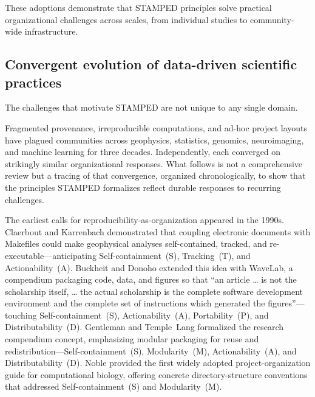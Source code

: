 \documentclass{article}
\makeatletter
\newcommand{\hyanchor}[1]{\texorpdfstring{\Hy@raisedlink{\hypertarget{#1}{}}}{}}
\newcommand{\anchoredsubsection}[2]{\subsection[#2]{\hyanchor{#1}#2}}
\makeatother
\begin{document}
These adoptions demonstrate that STAMPED principles solve practical organizational challenges across scales, from individual studies to community-wide infrastructure.

\anchoredsubsection{convergent-evolution}{Convergent evolution of data-driven scientific practices}

The challenges that motivate STAMPED are not unique to any single domain.

Fragmented provenance, irreproducible computations, and ad-hoc project layouts have plagued communities across geophysics, statistics, genomics, neuroimaging, and machine learning for three decades.
Independently, each converged on strikingly similar organizational responses.
What follows is not a comprehensive review but a tracing of that convergence, organized chronologically, to show that the principles STAMPED formalizes reflect durable responses to recurring challenges.

The earliest calls for reproducibility-as-organization appeared in the 1990s.
Claerbout and Karrenbach\cite{claerbout_electronic_1992} demonstrated that coupling electronic documents with Makefiles could make geophysical analyses self-contained, tracked, and re-executable---anticipating Self-containment~(S), Tracking~(T), and Actionability~(A).
Buckheit and Donoho\cite{bickel_wavelab_1995} extended this idea with WaveLab, a compendium packaging code, data, and figures so that ``an article \ldots{} is not the scholarship itself, \ldots{} the actual scholarship is the complete software development environment and the complete set of instructions which generated the figures''---touching Self-containment~(S), Actionability~(A), Portability~(P), and Distributability~(D).
Gentleman and Temple~Lang\cite{gentleman_statistical_2007} formalized the research compendium concept, emphasizing modular packaging for reuse and redistribution---Self-containment~(S), Modularity~(M), Actionability~(A), and Distributability~(D).
Noble\cite{noble_quick_2009} provided the first widely adopted project-organization guide for computational biology, offering concrete directory-structure conventions that addressed Self-containment~(S) and Modularity~(M).
\end{document}
